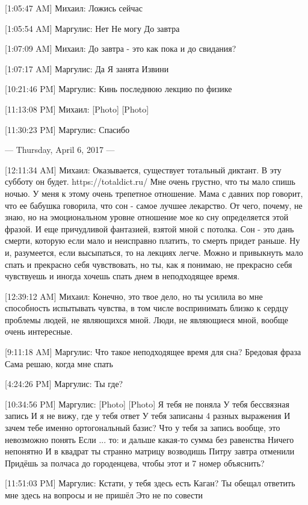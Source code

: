 \documentclass{article}
\begin{document}
[1:05:47 AM] Михаил:
Ложись сейчас

[1:05:54 AM] Маргулис:
Нет
 Не могу
 До завтра

[1:07:09 AM] Михаил:
До завтра - это как пока и до свидания?

[1:07:17 AM] Маргулис:
Да
 Я занята
 Извини

[10:21:46 PM] Маргулис:
Кинь последнюю лекцию по физике

[11:13:08 PM] Михаил:
[Photo]
 [Photo]

[11:30:23 PM] Маргулис:
Спасибо

--- Thursday, April 6, 2017 ---

[12:11:34 AM] Михаил:
Оказывается, существует тотальный диктант. В эту субботу он будет. 
https://totaldict.ru/
 Мне очень грустно, что ты мало спишь ночью. У меня к этому очень трепетное отношение. Мама с давних пор говорит, что ее бабушка говорила, что сон - самое лучшее лекарство. От чего, почему, не знаю, но на эмоциональном уровне отношение мое ко сну определяется этой фразой. И еще причудливой фантазией, взятой мной с потолка. Сон - это дань смерти, которую если мало и неисправно платить, то смерть придет раньше.
 Ну и, разумеется, если высыпаться, то на лекциях легче. Можно и привыкнуть мало спать и прекрасно себя чувствовать, но ты, как я понимаю, не прекрасно себя чувствуешь и иногда хочешь спать днем в неподходящее время.

[12:39:12 AM] Михаил:
Конечно, это твое дело, но ты усилила во мне способность испытывать чувства, в том числе воспринимать близко к сердцу проблемы людей, не являющихся мной.
 Люди, не являющиеся мной, вообще очень интересные.

[9:11:18 AM] Маргулис:
Что такое неподходящее время для сна?
 Бредовая фраза
 Сама решаю, когда мне спать

[4:24:26 PM] Маргулис:
Ты где?

[10:34:56 PM] Маргулис:
[Photo]
 [Photo]
 Я тебя не поняла
 У тебя бессвязная запись
 И я не вижу, где у тебя ответ
 У тебя записаны 4 разных выражения
 И зачем тебе именно ортогональный базис? Что у тебя за запись вообще, это невозможно понять
 Если ... то: и дальше какая-то сумма без равенства
 Ничего непонятно
 И в квадрат ты странно матрицу возводишь
 Питру завтра отменили
 Придёшь за полчаса до городенцева, чтобы этот и 7 номер объяснить?

[11:51:03 PM] Маргулис:
Кстати, у тебя здесь есть Каган?
 Ты обещал ответить мне здесь на вопросы и не пришёл
 Это не по совести
\end{document}
